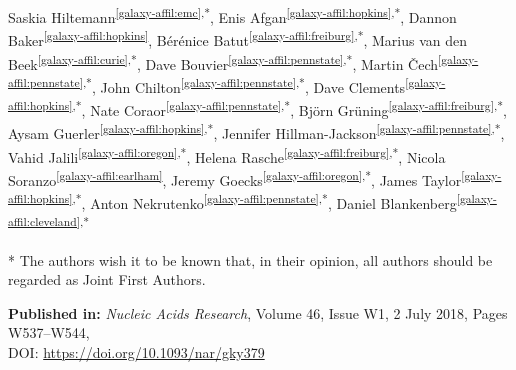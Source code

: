 \setcounter{NAT@ctr}{-1}
\cleartorightpage
\chapter*{}\label{chapter:galaxy}

\begin{changemargin}{0cm}{2cm}
\end{changemargin}


Saskia Hiltemann\textsuperscript{\ref{galaxy-affil:emc},*},
Enis Afgan\textsuperscript{\ref{galaxy-affil:hopkins},*},
Dannon Baker\textsuperscript{\ref{galaxy-affil:hopkins}},
Bérénice Batut\textsuperscript{\ref{galaxy-affil:freiburg},*},
Marius van den Beek\textsuperscript{\ref{galaxy-affil:curie},*},
Dave Bouvier\textsuperscript{\ref{galaxy-affil:pennstate},*},
Martin Čech\textsuperscript{\ref{galaxy-affil:pennstate},*},
John Chilton\textsuperscript{\ref{galaxy-affil:pennstate},*},
Dave Clements\textsuperscript{\ref{galaxy-affil:hopkins},*},
Nate Coraor\textsuperscript{\ref{galaxy-affil:pennstate},*},
Björn Grüning\textsuperscript{\ref{galaxy-affil:freiburg},*},
Aysam Guerler\textsuperscript{\ref{galaxy-affil:hopkins},*},
Jennifer Hillman-Jackson\textsuperscript{\ref{galaxy-affil:pennstate},*},
Vahid Jalili\textsuperscript{\ref{galaxy-affil:oregon},*},
Helena Rasche\textsuperscript{\ref{galaxy-affil:freiburg},*},
Nicola Soranzo\textsuperscript{\ref{galaxy-affil:earlham}},
Jeremy Goecks\textsuperscript{\ref{galaxy-affil:oregon},*},
James Taylor\textsuperscript{\ref{galaxy-affil:hopkins},*},
Anton Nekrutenko\textsuperscript{\ref{galaxy-affil:pennstate},*},
Daniel Blankenberg\textsuperscript{\ref{galaxy-affil:cleveland},*}

* The authors wish it to be known that, in their opinion, all authors should be regarded as Joint First Authors.

\textbf{Published in:} \emph{Nucleic Acids Research}, Volume 46, Issue W1, 2 July 2018, Pages W537–W544,  \\
DOI: \url{https://doi.org/10.1093/nar/gky379}


